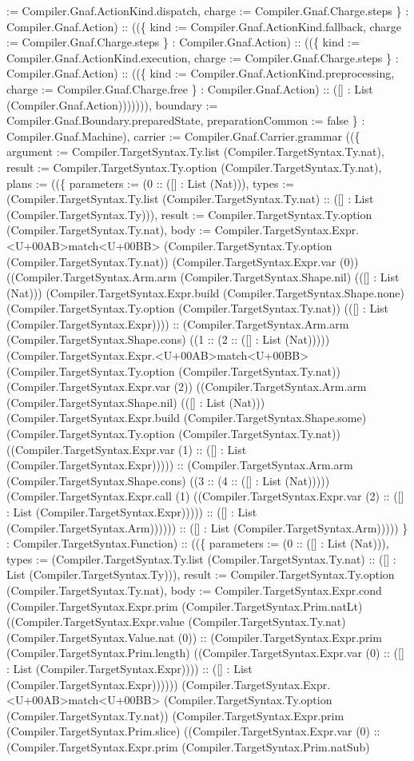 \documentclass[11pt]{article}
\begin{document}
:= Compiler.Gnaf.ActionKind.dispatch, charge := Compiler.Gnaf.Charge.steps \} : Compiler.Gnaf.Action) :: ((\{ kind := Compiler.Gnaf.ActionKind.fallback, charge := Compiler.Gnaf.Charge.steps \} : Compiler.Gnaf.Action) :: ((\{ kind := Compiler.Gnaf.ActionKind.execution, charge := Compiler.Gnaf.Charge.steps \} : Compiler.Gnaf.Action) :: ((\{ kind := Compiler.Gnaf.ActionKind.preprocessing, charge := Compiler.Gnaf.Charge.free \} : Compiler.Gnaf.Action) :: ([] : List (Compiler.Gnaf.Action))))))), boundary := Compiler.Gnaf.Boundary.preparedState, preparationCommon := false \} : Compiler.Gnaf.Machine), carrier := Compiler.Gnaf.Carrier.grammar ((\{ argument := Compiler.TargetSyntax.Ty.list (Compiler.TargetSyntax.Ty.nat), result := Compiler.TargetSyntax.Ty.option (Compiler.TargetSyntax.Ty.nat), plans := ((\{ parameters := (0 :: ([] : List (Nat))), types := (Compiler.TargetSyntax.Ty.list (Compiler.TargetSyntax.Ty.nat) :: ([] : List (Compiler.TargetSyntax.Ty))), result := Compiler.TargetSyntax.Ty.option (Compiler.TargetSyntax.Ty.nat), body := Compiler.TargetSyntax.Expr.<U+00AB>match<U+00BB> (Compiler.TargetSyntax.Ty.option (Compiler.TargetSyntax.Ty.nat)) (Compiler.TargetSyntax.Expr.var (0)) ((Compiler.TargetSyntax.Arm.arm (Compiler.TargetSyntax.Shape.nil) (([] : List (Nat))) (Compiler.TargetSyntax.Expr.build (Compiler.TargetSyntax.Shape.none) (Compiler.TargetSyntax.Ty.option (Compiler.TargetSyntax.Ty.nat)) (([] : List (Compiler.TargetSyntax.Expr)))) :: (Compiler.TargetSyntax.Arm.arm (Compiler.TargetSyntax.Shape.cons) ((1 :: (2 :: ([] : List (Nat))))) (Compiler.TargetSyntax.Expr.<U+00AB>match<U+00BB> (Compiler.TargetSyntax.Ty.option (Compiler.TargetSyntax.Ty.nat)) (Compiler.TargetSyntax.Expr.var (2)) ((Compiler.TargetSyntax.Arm.arm (Compiler.TargetSyntax.Shape.nil) (([] : List (Nat))) (Compiler.TargetSyntax.Expr.build (Compiler.TargetSyntax.Shape.some) (Compiler.TargetSyntax.Ty.option (Compiler.TargetSyntax.Ty.nat)) ((Compiler.TargetSyntax.Expr.var (1) :: ([] : List (Compiler.TargetSyntax.Expr))))) :: (Compiler.TargetSyntax.Arm.arm (Compiler.TargetSyntax.Shape.cons) ((3 :: (4 :: ([] : List (Nat))))) (Compiler.TargetSyntax.Expr.call (1) ((Compiler.TargetSyntax.Expr.var (2) :: ([] : List (Compiler.TargetSyntax.Expr))))) :: ([] : List (Compiler.TargetSyntax.Arm)))))) :: ([] : List (Compiler.TargetSyntax.Arm))))) \} : Compiler.TargetSyntax.Function) :: ((\{ parameters := (0 :: ([] : List (Nat))), types := (Compiler.TargetSyntax.Ty.list (Compiler.TargetSyntax.Ty.nat) :: ([] : List (Compiler.TargetSyntax.Ty))), result := Compiler.TargetSyntax.Ty.option (Compiler.TargetSyntax.Ty.nat), body := Compiler.TargetSyntax.Expr.cond (Compiler.TargetSyntax.Expr.prim (Compiler.TargetSyntax.Prim.natLt) ((Compiler.TargetSyntax.Expr.value (Compiler.TargetSyntax.Ty.nat) (Compiler.TargetSyntax.Value.nat (0)) :: (Compiler.TargetSyntax.Expr.prim (Compiler.TargetSyntax.Prim.length) ((Compiler.TargetSyntax.Expr.var (0) :: ([] : List (Compiler.TargetSyntax.Expr)))) :: ([] : List (Compiler.TargetSyntax.Expr)))))) (Compiler.TargetSyntax.Expr.<U+00AB>match<U+00BB> (Compiler.TargetSyntax.Ty.option (Compiler.TargetSyntax.Ty.nat)) (Compiler.TargetSyntax.Expr.prim (Compiler.TargetSyntax.Prim.slice) ((Compiler.TargetSyntax.Expr.var (0) :: (Compiler.TargetSyntax.Expr.prim (Compiler.TargetSyntax.Prim.natSub) 
\end{document}
